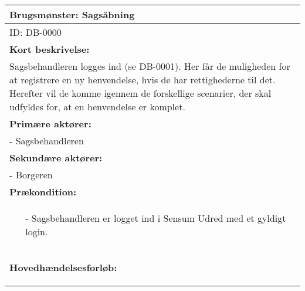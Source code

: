 \documentclass[../../main.tex]{subfiles}
\begin{document}
\begin{center}
\tiny
\begin{longtable}{| p{}|} 
\hline
Brugsmønster: Sagsåbning  \\ \hline

ID: DB-0000 \\ \hline

\textbf{Kort beskrivelse:} \\
Sagsbehandleren logges ind (se DB-0001). Her får de muligheden for at registrere en ny henvendelse, hvis de har rettighederne til det. Herefter vil de komme igennem de forskellige scenarier, der skal udfyldes for, at en henvendelse er komplet.   \\ \hline

\textbf{Primære aktører:} \\
- Sagsbehandleren \\ \hline

\textbf{Sekundære  aktører:} \\
- Borgeren  \\ \hline

\textbf{Prækondition:} \\
  \begin{minipage}[t]{\textwidth}
    \begin{itemize}
    \item[-] Sagsbehandleren er logget ind i Sensum Udred med et gyldigt login.
    \end{itemize}
  \end{minipage} \\ \hline

\textbf{Hovedhændelsesforløb:} 
 \begin{adjustwidth}{1cm}{}
  

\end{adjustwidth}
\end{longtable}
\end{center}
\end{document}
